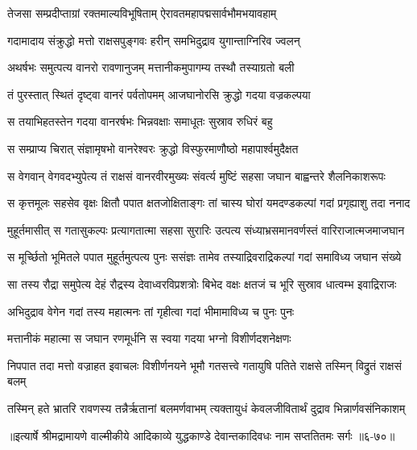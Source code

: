 \twolineshloka
{तेजसा सम्प्रदीप्ताग्रां रक्तमाल्यविभूषिताम्}
{ऐरावतमहापद्मसार्वभौमभयावहाम्} %

\twolineshloka
{गदामादाय संक्रुद्धो मत्तो राक्षसपुङ्गवः}
{हरीन् समभिदुद्राव युगान्ताग्निरिव ज्वलन्} %

\twolineshloka
{अथर्षभः समुत्पत्य वानरो रावणानुजम्}
{मत्तानीकमुपागम्य तस्थौ तस्याग्रतो बली} %

\twolineshloka
{तं पुरस्तात् स्थितं दृष्ट्वा वानरं पर्वतोपमम्}
{आजघानोरसि क्रुद्धो गदया वज्रकल्पया} %

\twolineshloka
{स तयाभिहतस्तेन गदया वानरर्षभः}
{भिन्नवक्षाः समाधूतः सुस्राव रुधिरं बहु} %

\twolineshloka
{स सम्प्राप्य चिरात् संज्ञामृषभो वानरेश्वरः}
{क्रुद्धो विस्फुरमाणौष्ठो महापार्श्वमुदैक्षत} %

\twolineshloka
{स वेगवान् वेगवदभ्युपेत्य तं राक्षसं वानरवीरमुख्यः}
{संवर्त्य मुष्टिं सहसा जघान बाह्वन्तरे शैलनिकाशरूपः} %

\twolineshloka
{स कृत्तमूलः सहसेव वृक्षः क्षितौ पपात क्षतजोक्षिताङ्गः}
{तां चास्य घोरां यमदण्डकल्पां गदां प्रगृह्याशु तदा ननाद} %

\twolineshloka
{मुहूर्तमासीत् स गतासुकल्पः प्रत्यागतात्मा सहसा सुरारिः}
{उत्पत्य संध्याभ्रसमानवर्णस्तं वारिराजात्मजमाजघान} %

\twolineshloka
{स मूर्च्छितो भूमितले पपात मुहूर्तमुत्पत्य पुनः ससंज्ञः}
{तामेव तस्याद्रिवराद्रिकल्पां गदां समाविध्य जघान संख्ये} %

\twolineshloka
{सा तस्य रौद्रा समुपेत्य देहं रौद्रस्य देवाध्वरविप्रशत्रोः}
{बिभेद वक्षः क्षतजं च भूरि सुस्राव धात्वम्भ इवाद्रिराजः} %

\twolineshloka
{अभिदुद्राव वेगेन गदां तस्य महात्मनः}
{तां गृहीत्वा गदां भीमामाविध्य च पुनः पुनः} %

\twolineshloka
{मत्तानीकं महात्मा स जघान रणमूर्धनि}
{स स्वया गदया भग्नो विशीर्णदशनेक्षणः} %

\threelineshloka
{निपपात तदा मत्तो वज्राहत इवाचलः}
{विशीर्णनयने भूमौ गतसत्त्वे गतायुषि}
{पतिते राक्षसे तस्मिन् विद्रुतं राक्षसं बलम्} %

\twolineshloka
{तस्मिन् हते भ्रातरि रावणस्य तन्नैर्ऋतानां बलमर्णवाभम्}
{त्यक्तायुधं केवलजीवितार्थं दुद्राव भिन्नार्णवसंनिकाशम्} %


॥इत्यार्षे श्रीमद्रामायणे वाल्मीकीये आदिकाव्ये युद्धकाण्डे देवान्तकादिवधः नाम सप्ततितमः सर्गः ॥६-७०॥
